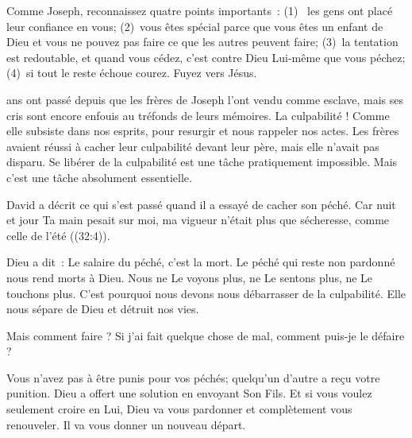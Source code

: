Comme Joseph, reconnaissez quatre points importants~:
 (1)~ les gens ont placé leur confiance en vous;
 (2)~vous êtes spécial parce que vous êtes un enfant de Dieu
  et vous ne pouvez pas faire ce que les autres peuvent faire;
 (3)~la tentation est redoutable, et quand vous cédez,
  c'est contre Dieu Lui-même que vous péchez;
 (4)~si tout le reste échoue \ocadr{}courez. Fuyez vers Jésus.

\dvrule






 ans ont passé depuis que les frères de Joseph
 l'ont vendu comme esclave, mais ses cris sont encore enfouis
 au tréfonds de leurs mémoires. La culpabilité !
 Comme elle subsiste dans nos esprits, pour resurgir
 et nous rappeler nos actes.
 Les frères avaient réussi à cacher leur culpabilité devant leur père,
 mais elle n'avait pas disparu.
 Se libérer de la culpabilité est une tâche pratiquement impossible.
 Mais c'est une tâche absolument essentielle. 


David a décrit ce qui s'est passé quand il a essayé de cacher son péché.
 \og Car nuit et jour Ta main pesait sur moi,
 ma vigueur n'était plus que sécheresse, comme celle de l'été \fg{}
 ((32:4)). 

Dieu a dit~: \og Le salaire du péché, c'est la mort. \fg{}
 Le péché qui reste non pardonné nous rend morts à Dieu.
 Nous ne Le voyons plus, ne Le sentons plus, ne Le touchons plus.
 C'est pourquoi nous devons nous débarrasser de la culpabilité.
 Elle nous sépare de Dieu et détruit nos vies. 

Mais comment faire ? Si j'ai fait quelque chose de mal,
 comment puis-je le \og défaire \fg{} ? 

Vous n'avez pas à être punis pour vos péchés;
 quelqu'un d'autre a reçu votre punition.
 Dieu a offert une solution en envoyant Son Fils.
 Et si vous voulez seulement croire en Lui,
 Dieu va vous pardonner et complètement vous renouveler.
 Il va vous donner un nouveau départ.

